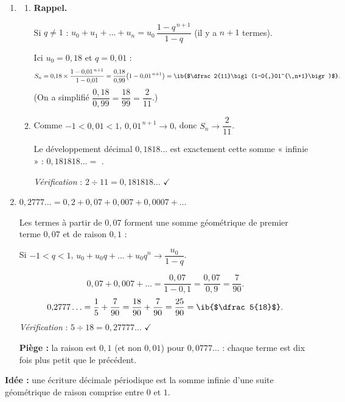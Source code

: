 \begin{enumerate}
  \item
  \begin{enumerate}
    \item \textbf{Rappel.}\par
  \begin{prop}
    Si $q\neq1$ : $u_0+u_1+\dots+u_n=u_0\,\dfrac{1-q^{\,n+1}}{1-q}$ (il y a $n+1$ termes).
    \end{prop}
    Ici $u_0=0{,}18$ et $q=0{,}01$ :
    $$S_n=0{,}18\times\frac{1-0{,}01^{\,n+1}}{1-0{,}01}=\frac{0{,}18}{0{,}99}\bigl(1-0{,}01^{\,n+1}\bigr)=\ib{$\dfrac2{11}\bigl(1-0{,}01^{\,n+1}\bigr)$}.$$
    (On a simplifié $\dfrac{0{,}18}{0{,}99}=\dfrac{18}{99}=\dfrac2{11}$.)
    \item Comme $-1<0{,}01<1$, $0{,}01^{\,n+1}\to0$, donc $S_n\to\dfrac2{11}$.

    Le développement décimal $0{,}1818\ldots$ est exactement cette somme « infinie » : $0{,}181818\ldots=$ .

    \emph{Vérification} : $2\div11=0{,}181818\ldots$ $\checkmark$
  \end{enumerate}
  \item $0{,}2777\ldots=0{,}2+0{,}07+0{,}007+0{,}0007+\dots$

  Les termes à partir de $0{,}07$ forment une somme géométrique de premier terme $0{,}07$ et de raison $0{,}1$ :
  \begin{prop}
  Si $-1<q<1$, $u_0+u_0q+\dots+u_0q^n\to\dfrac{u_0}{1-q}$.
  \end{prop}
  $$0{,}07+0{,}007+\dots=\frac{0{,}07}{1-0{,}1}=\frac{0{,}07}{0{,}9}=\frac7{90}.$$
  $$0{,}2777\ldots=\frac15+\frac7{90}=\frac{18}{90}+\frac7{90}=\frac{25}{90}=\ib{$\dfrac5{18}$}.$$
  \emph{Vérification} : $5\div18=0{,}27777\ldots$ $\checkmark$

  \textbf{Piège :} la raison est $0{,}1$ (et non $0{,}01$) pour $0{,}0777\ldots$ : chaque terme est dix fois plus petit que le précédent.
\end{enumerate}

\textbf{Idée :} une écriture décimale périodique est la somme infinie d'une suite géométrique de raison comprise entre $0$ et $1$.
